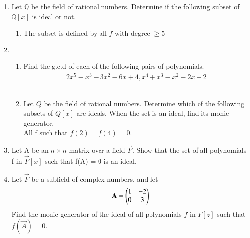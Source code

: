\renewcommand{\theequation}{\theenumi}
\renewcommand{\thefigure}{\theenumi}
\begin{enumerate}[label=\thesubsection.\arabic*.,ref=\thesubsection.\theenumi]

\item Let $\mathbb{Q}$ be the field of rational numbers. Determine if the following subset of $\mathbb{Q}[x]$ is ideal or not. 
\begin{enumerate}
\item The subset is defined by all $f$ with degree $\geq 5$
%
%
\\
\solution

\end{enumerate}
\item 
\begin{enumerate}
\item Find the g.c.d of each of the following pairs of polynomials.
    \begin{align}
    2x^{5}-x^{3}-3x^{2}-6x+4 , x^{4}+x^{3}-x^{2}-2x-2
    \end{align}
%
\\
\solution

\item Let $Q$ be the field of rational numbers. Determine which of the following subsets of $Q[x]$ are ideals. When the set is an ideal, find its monic generator.\\
All f such that $f(2)=f(4)=0$.
%
\\
\solution

\end{enumerate}
\item Let A be an $n \times n$ matrix over a field $\vec{F}$. Show that the set of all polynomials
f in $\vec{F}[x]$ such that f(A) = 0 is an ideal.
%
\\
\solution

\item Let $\vec{F}$ be a subfield of complex numbers, and let
\begin{align}
\mathbf{A}=\begin{pmatrix}1&-2\\0&3\end{pmatrix}
\end{align}
Find the monic generator of the ideal of all polynomials $f$ in $F[z]$ such that $f(\vec{A}) = 0$.
%
\\
\solution

\end{enumerate}
